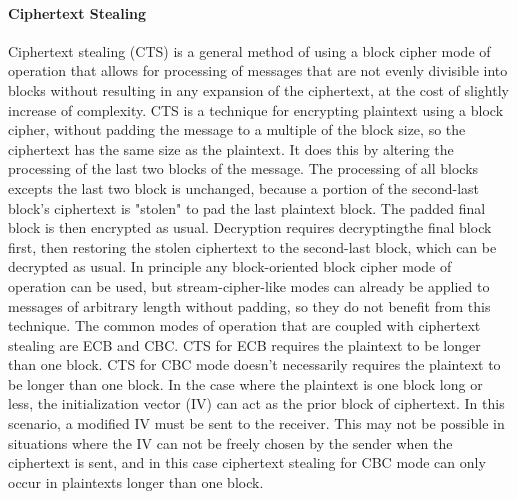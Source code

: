 \documentclass[11pt]{article}
\begin{document}
\paragraph{Ciphertext Stealing} Ciphertext stealing (CTS) is a general method of using a block cipher mode of operation that allows for processing of messages that are not evenly divisible into blocks without resulting in any expansion of the ciphertext, at the cost of slightly  increase of complexity. CTS is a technique for encrypting plaintext using a block cipher, without padding the message to a multiple of the block size, so the ciphertext has the same size as the plaintext. It does this by altering the processing of the last two blocks of the message. The processing of all blocks excepts the last two block is unchanged, because a portion of the second-last block's ciphertext is "stolen" to pad the last plaintext block. The padded final block is then encrypted as usual. Decryption requires decryptingthe final block first, then restoring the stolen ciphertext to the second-last block, which can be decrypted as usual. In principle any block-oriented block cipher mode of operation can be used, but stream-cipher-like modes can already be applied to messages of arbitrary length without padding, so they do not benefit from this technique. The common modes of operation that are coupled with ciphertext stealing are ECB and CBC. CTS for ECB requires the plaintext to be longer than one block. CTS for CBC mode doesn't necessarily requires the plaintext to be longer than one block. In the case where the plaintext is one block long or less, the initialization vector (IV) can act as the prior block of ciphertext. In this scenario, a modified IV must be sent to the receiver. This may not be possible in situations where the IV can not be freely chosen by the sender when the ciphertext is sent, and in this case ciphertext stealing for CBC mode can only occur in plaintexts longer than one block.
\end{document}
